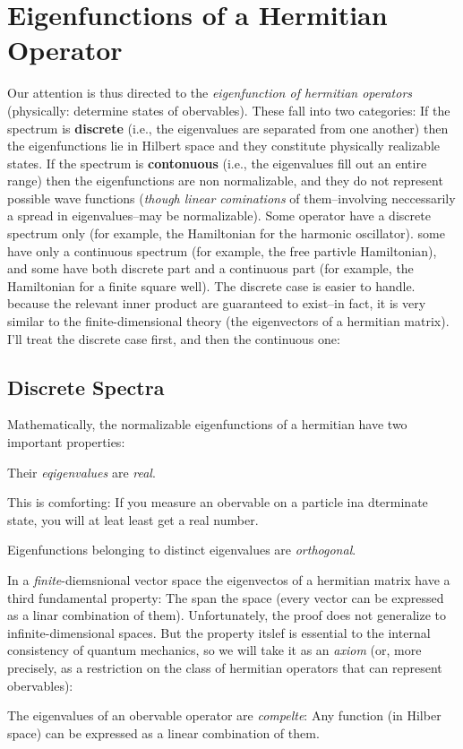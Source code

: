\section{Eigenfunctions of a Hermitian Operator}
Our attention is thus directed to the \textit{eigenfunction of hermitian operators} (physically: determine states of obervables). These fall into two categories: If the spectrum is \textbf{discrete} (i.e., the eigenvalues are separated from one another) then the eigenfunctions lie in Hilbert space and they constitute physically realizable states. If the spectrum is \textbf{contonuous} (i.e., the eigenvalues fill out an entire range) then the eigenfunctions are non normalizable, and they do not represent possible wave functions (\textit{though linear cominations} of them--involving neccessarily a spread in eigenvalues--may be normalizable). Some operator have a discrete spectrum only (for example, the Hamiltonian for the harmonic oscillator). some have only a continuous spectrum (for example, the free partivle Hamiltonian), and some have both discrete part and a continuous part (for example, the Hamiltonian for a finite square well). The discrete case is easier to handle. because the relevant inner product are guaranteed to exist--in fact, it is very similar to the finite-dimensional theory (the eigenvectors of a hermitian matrix). I'll treat the discrete case first, and then the continuous one:

\subsection{Discrete Spectra}
Mathematically, the normalizable eigenfunctions of a hermitian have two important properties:
\begin{theorem}
	Their \textit{eqigenvalues} are \textit{real}.
\end{theorem}
This is comforting: If you measure an obervable on a particle ina  dterminate state, you will at leat least get a real number.
\begin{theorem}
	Eigenfunctions belonging to distinct eigenvalues are \textit{orthogonal}.
\end{theorem}
In  a \textit{finite}-diemsnional vector space the eigenvectos of a hermitian matrix have a third fundamental property: The span the space (every vector can be expressed as a linar combination of them). Unfortunately, the proof does not generalize to infinite-dimensional spaces. But the property itslef is essential to the internal consistency of quantum mechanics, so we will take it as an \textit{axiom} (or, more precisely, as a restriction on the class of hermitian operators that can represent obervables):
\begin{axiom}
	The eigenvalues of an obervable operator are \textit{compelte}: Any function (in Hilber space) can be expressed as a linear combination of them.
\end{axiom}

